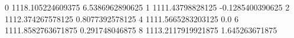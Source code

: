 0 1118.105224609375 6.5386962890625
1 1111.43798828125 -0.1285400390625
2 1112.374267578125 0.8077392578125
4 1111.5665283203125 0.0
6 1111.8582763671875 0.291748046875
8 1113.2117919921875 1.645263671875
